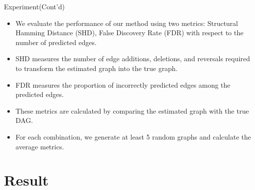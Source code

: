 \documentclass{beamer}
\begin{document}
\begin{frame}{Experiment(Cont'd)}
    \begin{itemize}
        \item We evaluate the performance of our method using two metrics: Structural Hamming Distance (SHD), False Discovery Rate (FDR) with respect to the number of predicted edges.
        \item SHD measures the number of edge additions, deletions, and reversals required to transform the estimated graph into the true graph.
        \item FDR measures the proportion of incorrectly predicted edges among the predicted edges.
        \item These metrics are calculated by comparing the estimated graph with the true DAG.
        \item For each combination, we generate at least 5 random graphs and calculate the average metrics.
    \end{itemize}
\end{frame}

\section{Result}
\end{document}
